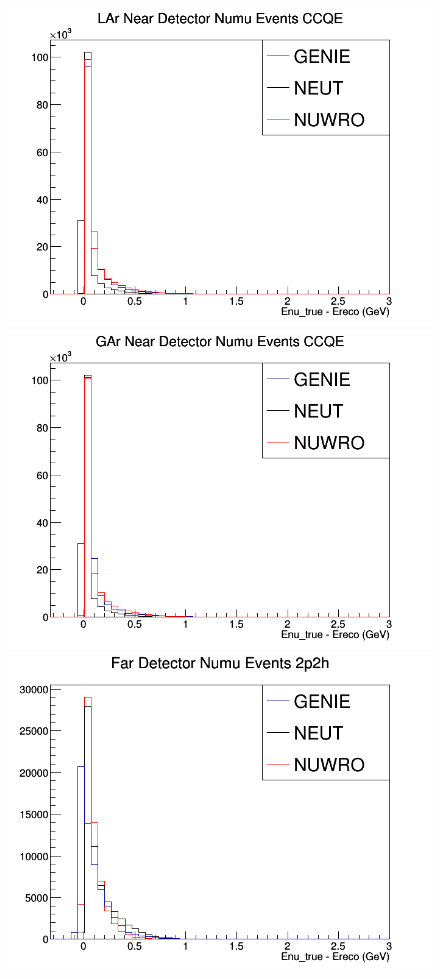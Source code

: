 \documentclass[12pt]{article}
\begin{document}
\begin{figure}[h]
\endminipage
{}
\includegraphics[width=\linewidth]{Ereco_Etrue/numu_LAr_CCQE.png}
\endminipage
{}
\includegraphics[width=\linewidth]{Ereco_Etrue/numu_GAr_CCQE.png}
\endminipage
\newline
{}
\includegraphics[width=\linewidth]{Ereco_Etrue/numu_FD_2p2h.png}

\end{figure}
\end{document}
